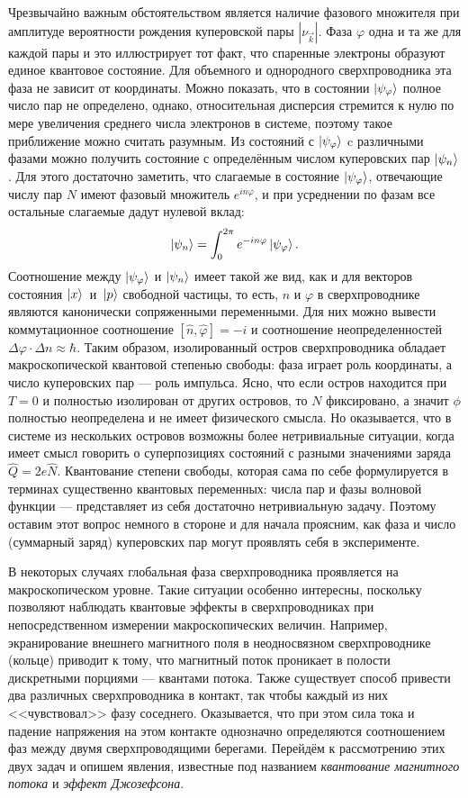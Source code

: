 Чрезвычайно важным обстоятельством является наличие фазового множителя при амплитуде вероятности рождения куперовской пары $|\nu_{\vec{k}}|$. Фаза $\varphi$ одна и та же для каждой пары и это иллюстрирует тот факт, что спаренные электроны образуют единое квантовое состояние. Для объемного и однородного сверхпроводника эта фаза не зависит от координаты. Можно показать, что в состоянии $\ket{\psi_\varphi}$ полное число пар не определено, однако, относительная дисперсия стремится к нулю по мере увеличения среднего числа электронов в системе, поэтому такое приближение можно считать разумным. Из состояний с $\ket{\psi_\varphi}$ c различными фазами можно получить состояние с определённым числом куперовских пар $\ket{\psi_n}$. Для этого достаточно заметить, что слагаемые в состояние $\ket{\psi_\varphi}$, отвечающие числу пар $N$ имеют фазовый множитель $e^{in{\varphi}}$, и при усреднении по фазам все остальные слагаемые дадут нулевой вклад:
\begin{equation}
\ket{\psi_n} = \int_{0}^{2 \pi}e^{-i n \varphi} \ket{\psi_\varphi}.
\end{equation} 
Соотношение между $\ket{\psi_\varphi}$ и $\ket{\psi_n}$ имеет такой же вид, как и для векторов состояния $\ket{x}$~и~$\ket{p}$ свободной частицы, то есть, $n$ и $\varphi$ в сверхпроводнике являются канонически сопряженными переменными. Для них можно вывести коммутационное соотношение $[\hat{n}, \hat{\varphi}]=-i$ и соотношение неопределенностей $\Delta\varphi \cdot \Delta n \approx \hbar$. Таким образом, изолированный остров сверхпроводника обладает макроскопической квантовой степенью свободы: фаза играет роль координаты, а число куперовских пар --- роль импульса. Ясно, что если остров находится при $T\!=\!0$ и полностью изолирован от других островов, то $N$ фиксировано, а значит $\phi$ полностью неопределена и не имеет физического смысла. Но оказывается, что в системе из нескольких островов возможны более нетривиальные ситуации, когда имеет смысл говорить о суперпозициях состояний с разными значениями заряда $\hat{Q}\! = \!2e\hat{N}$. Квантование степени свободы, которая сама по себе формулируется в терминах существенно квантовых переменных: числа пар и фазы волновой функции --- представляет из себя достаточно нетривиальную задачу. Поэтому оставим этот вопрос немного в стороне и для начала проясним, как фаза и число (суммарный заряд) куперовских пар могут проявлять себя в эксперименте. 

В некоторых случаях глобальная фаза сверхпроводника проявляется на макроскопическом уровне. Такие ситуации особенно интересны, поскольку позволяют наблюдать квантовые эффекты в сверхпроводниках при непосредственном измерении макроскопических величин. Например, экранирование внешнего магнитного поля в неодносвязном сверхпроводнике (кольце) приводит к тому, что магнитный поток проникает в полости дискретными порциями --- квантами потока. Также существует способ привести два различных сверхпроводника в контакт, так чтобы каждый из них <<чувствовал>> фазу соседнего. Оказывается, что при этом сила тока и падение напряжения на этом контакте однозначно определяются соотношением фаз между двумя сверхпроводящими берегами. Перейдём к рассмотрению этих двух задач и опишем явления, известные под названием \textit{квантование магнитного потока} и \textit{эффект Джозефсона}.
